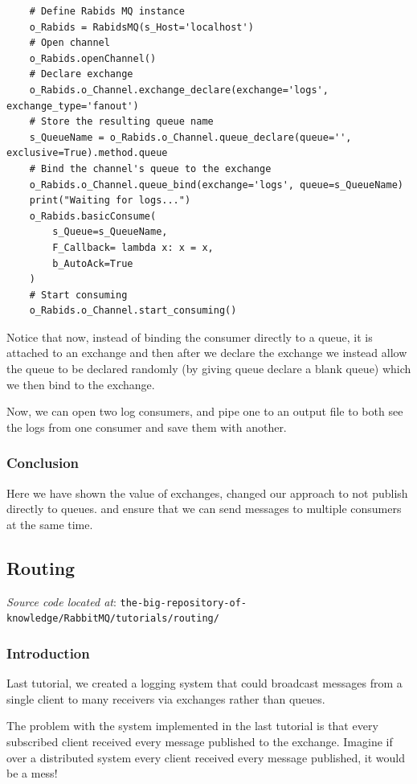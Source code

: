\documentclass{article}
\begin{document}
\begin{verbatim}
    # Define Rabids MQ instance
    o_Rabids = RabidsMQ(s_Host='localhost')
    # Open channel 
    o_Rabids.openChannel()
    # Declare exchange
    o_Rabids.o_Channel.exchange_declare(exchange='logs', exchange_type='fanout')
    # Store the resulting queue name
    s_QueueName = o_Rabids.o_Channel.queue_declare(queue='', exclusive=True).method.queue
    # Bind the channel's queue to the exchange
    o_Rabids.o_Channel.queue_bind(exchange='logs', queue=s_QueueName)
    print("Waiting for logs...")
    o_Rabids.basicConsume(
        s_Queue=s_QueueName,
        F_Callback= lambda x: x = x,
        b_AutoAck=True
    )
    # Start consuming
    o_Rabids.o_Channel.start_consuming()
\end{verbatim}

Notice that now, instead of binding the consumer directly to a queue, it is attached to an exchange and then after we declare the exchange we instead allow the queue to be declared randomly (by giving queue declare a blank queue) which we then bind to the exchange.

Now, we can open two log consumers, and pipe one to an output file to both see the logs from one consumer and save them with another.

\subsubsection{Conclusion}

Here we have shown the value of exchanges, changed our approach to not publish directly to queues. and ensure that we can send messages to multiple consumers at the same time.

\subsection{Routing}

\textit{Source code located at}: \verb|the-big-repository-of-knowledge/RabbitMQ/tutorials/routing/|

\subsubsection{Introduction}

Last tutorial, we created a logging system that could broadcast messages from a single client to many receivers via exchanges rather than queues. 

The problem with the system implemented in the last tutorial is that every subscribed client received every message published to the exchange. Imagine if over a distributed system every client received every message published, it would be a mess! 
\end{document}
